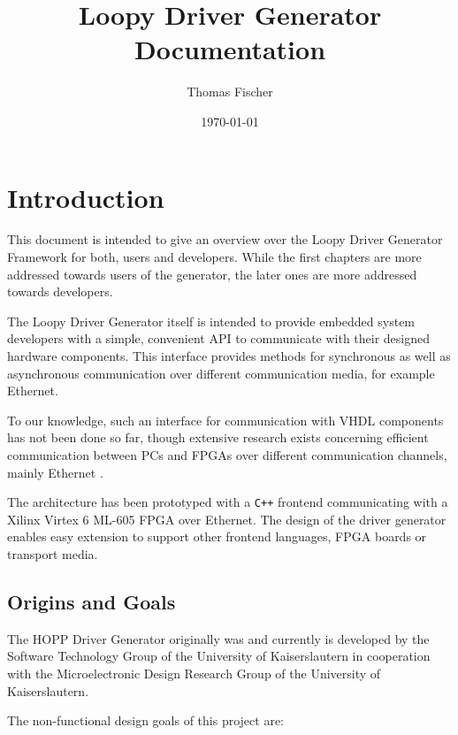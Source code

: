 \documentclass{report}
\begin{document}
\title{Loopy Driver Generator Documentation}
\author{Thomas Fischer}
\date{\today}

\maketitle
\thispagestyle{empty}
\newpage

\tableofcontents
\thispagestyle{empty}
\newpage


\chapter{Introduction}
\label{sec:intro}
This document is intended to give an overview over the Loopy Driver Generator Framework for both, users and developers. While the first chapters are more addressed towards users of the generator, the later ones are more addressed towards developers. 

The Loopy Driver Generator itself is intended to provide embedded system developers %
with a simple, convenient API to communicate with their designed hardware components. %
This interface provides methods for synchronous as well as asynchronous communication over different communication media, for example Ethernet.

To our knowledge, such an interface for communication with VHDL components has not been done so far, though extensive research exists concerning efficient communication between PCs and FPGAs over different communication channels, mainly Ethernet \cite{lofgren05, alachiotis10, alachiotis12}.

The architecture has been prototyped with a \texttt{C++} frontend communicating with a Xilinx Virtex 6 ML-605 FPGA over Ethernet. The design of the driver generator enables easy extension to support other frontend languages, FPGA boards or transport media.

\section{Origins and Goals}
\label{sec:goals}
The HOPP Driver Generator originally was and currently is developed by the Software Technology Group of the University of Kaiserslautern in cooperation with the Microelectronic Design Research Group of the University of Kaiserslautern.

The non-functional design goals of this project are:
\end{document}
